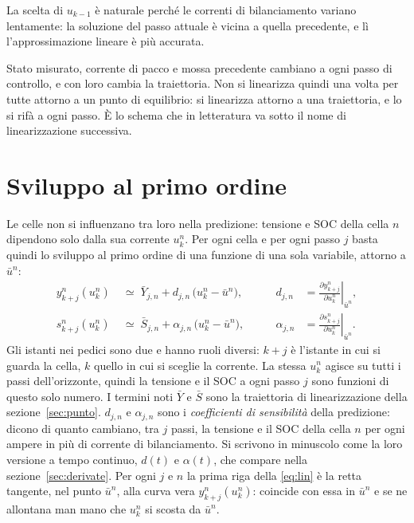 \documentclass[11pt,a4paper]{article}
\begin{document}
La scelta di $u_{k-1}$ è naturale perché le correnti di bilanciamento variano
lentamente: la soluzione del passo attuale è vicina a quella precedente, e lì
l'approssimazione lineare è più accurata.

Stato misurato, corrente di pacco e mossa precedente cambiano a ogni passo di
controllo, e con loro cambia la traiettoria. Non si linearizza quindi una volta
per tutte attorno a un punto di equilibrio: si linearizza attorno a una
traiettoria, e lo si rifà a ogni passo. È lo schema che in letteratura va sotto
il nome di linearizzazione successiva.

\section{Sviluppo al primo ordine}\label{sec:sviluppo}

Le celle non si influenzano tra loro nella predizione: tensione e SOC della
cella $n$ dipendono solo dalla sua corrente $u^n_k$. Per ogni cella e per ogni
passo $j$ basta quindi lo sviluppo al primo ordine di una funzione di una sola
variabile, attorno a $\bar u^n$:
\begin{equation}
\begin{aligned}
  y^n_{k+j}(u^n_k) &\;\simeq\; \bar Y_{j,n} + d_{j,n}\,\bigl(u^n_k - \bar u^n\bigr),
  &\qquad
  d_{j,n} &= \left.\frac{\partial y^n_{k+j}}{\partial u^n_k}\right|_{\bar u^n} , \\[6pt]
  s^n_{k+j}(u^n_k) &\;\simeq\; \bar S_{j,n} + \alpha_{j,n}\,\bigl(u^n_k - \bar u^n\bigr),
  &\qquad
  \alpha_{j,n} &= \left.\frac{\partial s^n_{k+j}}{\partial u^n_k}\right|_{\bar u^n} .
\end{aligned}
\label{eq:lin}
\end{equation}
Gli istanti nei pedici sono due e hanno ruoli diversi: $k+j$ è l'istante in
cui si guarda la cella, $k$ quello in cui si sceglie la corrente. La stessa
$u^n_k$ agisce su tutti i passi dell'orizzonte, quindi la tensione e il SOC a
ogni passo $j$ sono funzioni di questo solo numero.
I termini noti $\bar Y$ e $\bar S$ sono la traiettoria di linearizzazione
della sezione~\ref{sec:punto}. $d_{j,n}$ e $\alpha_{j,n}$ sono i \emph{coefficienti
di sensibilità} della predizione: dicono di quanto cambiano, tra $j$ passi, la
tensione e il SOC della cella $n$ per ogni ampere in più di corrente di
bilanciamento. Si scrivono in minuscolo come la loro versione a tempo
continuo, $d(t)$ e $\alpha(t)$, che compare nella sezione~\ref{sec:derivate}.
Per ogni $j$ e $n$ la prima riga della \eqref{eq:lin} è la
retta tangente, nel punto $\bar u^n$, alla curva vera $y^n_{k+j}(u^n_k)$:
coincide con essa in $\bar u^n$ e se ne allontana man mano che $u^n_k$ si
scosta da $\bar u^n$.
\end{document}
